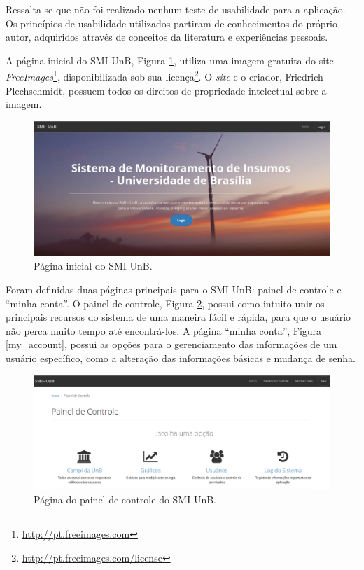 Ressalta-se que não foi realizado nenhum teste de usabilidade para a aplicação. Os princípios de usabilidade utilizados partiram de conhecimentos do próprio autor, adquiridos através de conceitos da literatura e experiências pessoais.

A página inicial do SMI-UnB, Figura \ref{main_page}, utiliza uma imagem gratuita do site \textit{FreeImages}\footnote{\url{http://pt.freeimages.com}}, disponibilizada sob sua licença\footnote{\url{http://pt.freeimages.com/license}}. O \textit{site} e o criador, Friedrich Plechschmidt, possuem todos os direitos de propriedade intelectual sobre a imagem.

\begin{figure}[!h]
    \centering
    \includegraphics[scale=0.35]{figuras/main_page.eps}
    \caption{Página inicial do SMI-UnB.}
    \label{main_page}
\end{figure}

Foram definidas duas páginas principais para o SMI-UnB: painel de controle e ``minha conta''. O painel de controle, Figura \ref{dashboard}, possui como intuito unir os principais recursos do sistema de uma maneira fácil e rápida, para que o usuário não perca muito tempo até encontrá-los. A página ``minha conta'', Figura \ref{my_account}, possui as opções para o gerenciamento das informações de um usuário específico, como a alteração das informações básicas e mudança de senha.

\begin{figure}[!h]
    \centering
    \includegraphics[scale=0.35]{figuras/dashboard.eps}
    \caption{Página do painel de controle do SMI-UnB.}
    \label{dashboard}
\end{figure}


